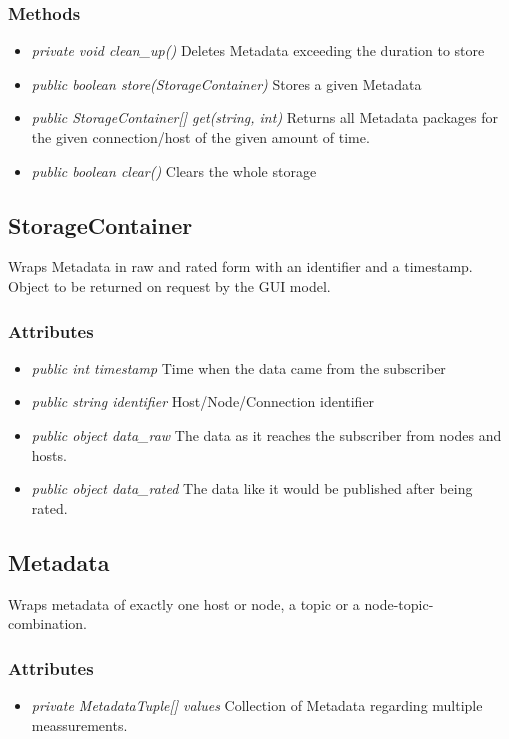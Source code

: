 \subsubsection{Methods}
\begin{itemize}
	\item \textit{private void clean\_up()}
	Deletes Metadata exceeding the duration to store
	\item \textit{public boolean store(StorageContainer)}
	Stores a given Metadata
	\item \textit{public StorageContainer[] get(string, int)}
	Returns all Metadata packages for the given connection/host of the given amount of time.
	\item \textit{public boolean clear()}
	Clears the whole storage
\end{itemize}


\subsection{StorageContainer}
Wraps Metadata in raw and rated form with an identifier and a timestamp. Object to be returned on request by the GUI model.

\subsubsection{Attributes}
\begin{itemize}
	\item \textit{public int timestamp}
	Time when the data came from the subscriber
	\item \textit{public string identifier}
	Host/Node/Connection identifier
	\item \textit{public object data\_raw}
	The data as it reaches the subscriber from nodes and hosts.
	\item \textit{public object data\_rated}
	The data like it would be published after being rated.
\end{itemize}


\subsection{Metadata}
Wraps metadata of exactly one host or node, a topic or a node-topic-combination.

\subsubsection{Attributes}
\begin{itemize}
	\item \textit{private MetadataTuple[] values}
	Collection of Metadata regarding multiple meassurements.
\end{itemize}
